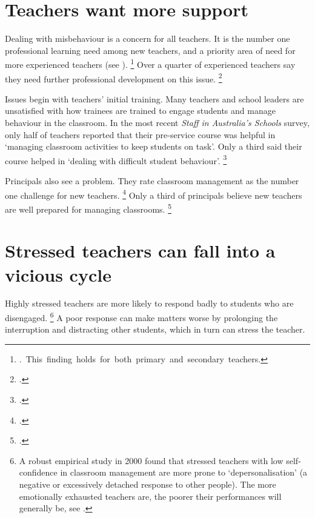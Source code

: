 \documentclass{grattan}
\begin{document}
\citetrackertrue

\section{Teachers want more support}\label{sec:teachers-want-support}

Dealing with misbehaviour is a concern for all teachers. It is the number one professional learning need among new teachers, and a priority area of need for more experienced teachers (see ).%
    \footnote{\mbox{\textcite{McKenzie2014StaffAustraliasSchools}. This finding holds for both primary and secondary teachers}.}  %
Over a quarter of experienced teachers say they need further professional development on this issue.%
    \footcite{McKenzie2014StaffAustraliasSchools}

Issues begin with teachers' initial training. Many teachers and school leaders are unsatisfied with how trainees are trained to engage students and manage behaviour in the classroom. In the most recent \emph{Staff in Australia's Schools} survey, only half of teachers reported that their pre-service course was helpful in `managing classroom activities to keep students on task'. Only a third said their course helped in `dealing with difficult student behaviour'.%
    \footcite{McKenzie2014StaffAustraliasSchools}

Principals also see a problem. They rate classroom management as the number one challenge for new teachers.%
    \footcite{Mayer2014LongitudinalTeacherEducation}
Only a third of principals believe new teachers are well prepared for managing classrooms.%
    \footcite{AITSL2015InitialTeacherEducation}


\section{Stressed teachers can fall into a vicious cycle}\label{sec:stressed-teachers-vicious-cycle}
Highly stressed teachers are more likely to respond badly to students who are disengaged.%
    \footnote{A robust empirical study in 2000 found that stressed teachers with low self-confidence in classroom management are more prone to `depersonalisation' (a negative or excessively detached response to other people). The more emotionally exhausted teachers are, the poorer their performances will generally be, see \textcite{BrouwersTomic2000LongitudinalStudyTeacher}.}
A poor response can make matters worse by prolonging the interruption and distracting other students, which in turn can stress the teacher.
\end{document}
